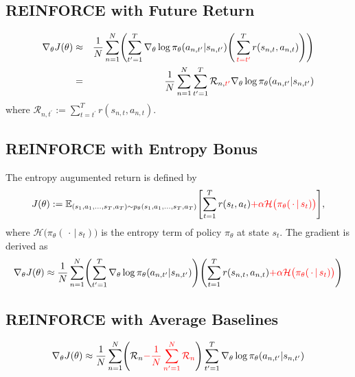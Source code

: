 \documentclass{article}
\begin{document}
\subsection{REINFORCE with Future Return}

\begin{eqnarray}
\nabla_\theta J(\theta) 
&\approx& \frac{1}{N} \sum_{n=1}^{N} \Biggl( \sum_{t^\prime=1}^{T} \nabla_\theta \log \pi_\theta (a_{n, t^\prime}|s_{n, t^\prime}) \Biggl(\, \sum_{{\color{red}{t=t^\prime}}}^{T} r(s_{n, t}, a_{n, t}) \Biggr) \Biggr)  \\
&=& \frac{1}{N} \sum_{n=1}^{N} \sum_{t^\prime=1}^{T} \mathcal{R}_{n, {\color{red}{t^\prime}}} \nabla_\theta \log \pi_\theta (a_{n, t^\prime}|s_{n, t^\prime}) 
\end{eqnarray}
where $\mathcal{R}_{n, t^\prime} := \sum_{t=t^\prime}^T r(s_{n, t}, a_{n, t})$.


\subsection{REINFORCE with Entropy Bonus}
The entropy augumented return is defined by
\begin{eqnarray}
J(\theta) := \mathbb{E}_{(s_1, a_1, \ldots, s_T, a_T) \sim p_\theta(s_1, a_1, \ldots, s_T, a_T)} \Biggl[ \sum_{t=1}^{T} r(s_t, a_t) {\color{red}{ + \alpha \mathcal{H} \bigl(\pi_\theta(\, \cdot \,|\, s_t) \bigr) }}\Biggr],
\end{eqnarray}
where $\mathcal{H} \bigl(\pi_\theta(\, \cdot \,|\, s_t) \bigr)$ is the entropy term of policy $\pi_\theta$ at state $s_t$.
The gradient is derived as 
\begin{eqnarray}
\nabla_\theta J(\theta) 
\approx \frac{1}{N} \sum_{n=1}^{N} \Biggl( \sum_{t^\prime=1}^{T} \nabla_\theta \log \pi_\theta (a_{n, t^\prime}|s_{n, t^\prime}) \Biggr) \Biggl( \sum_{t=1}^T r(s_{n, t}, a_{n, t}) {\color{red}{ + \alpha \mathcal{H} \bigl(\pi_\theta(\, \cdot \,|\, s_t) \bigr) }} \Biggr)
\end{eqnarray}

\subsection{REINFORCE with Average Baselines}

\begin{eqnarray}
\nabla_\theta J(\theta) 
\approx \frac{1}{N} \sum_{n=1}^{N} \Biggl(\mathcal{R}_n {\color{red}{- \frac{1}{N} \sum_{n^\prime=1}^N \mathcal{R}_n }} \Biggr)\sum_{t^\prime=1}^{T} \nabla_\theta \log \pi_\theta (a_{n, t^\prime}|s_{n, t^\prime}) 
\end{eqnarray}
\end{document}
